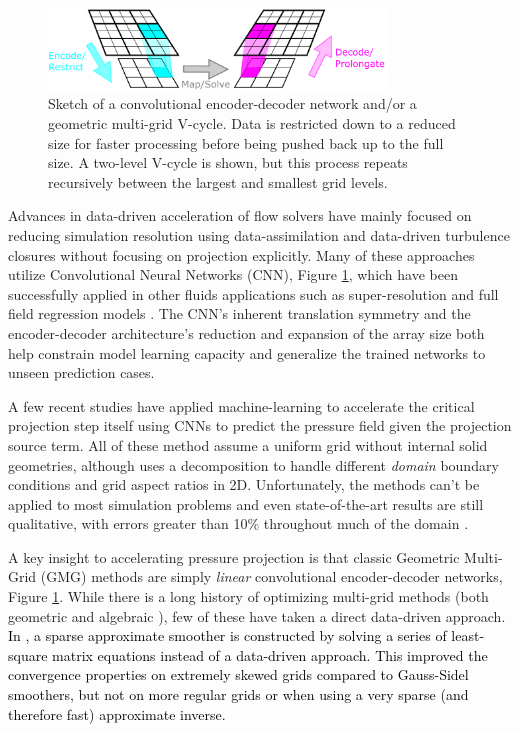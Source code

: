 \documentclass[]{elsarticle}
\begin{document}
\begin{figure}
    \centering
    \includegraphics[width=0.8\textwidth]{figures/drawing}
    \caption{Sketch of a convolutional encoder-decoder network and/or a geometric multi-grid V-cycle. Data is restricted down to a reduced size for faster processing before being pushed back up to the full size. A two-level V-cycle is shown, but this process repeats recursively between the largest and smallest grid levels.}
    \label{fig:multigrid}
\end{figure}

Advances in data-driven acceleration of flow solvers have mainly focused on reducing simulation resolution using data-assimilation and data-driven turbulence closures \cite{asch2016data,BECK2019108910,maulik_san_rasheed_vedula_2019,ling_kurzawski_templeton_2016,font2021deep} without focusing on projection explicitly. Many of these approaches utilize Convolutional Neural Networks (CNN), Figure \ref{fig:multigrid}, which have been successfully applied in other fluids applications such as super-resolution \cite{liu2020deep} and full field regression models \cite{bhatnagar2019prediction}. The CNN's inherent translation symmetry and the encoder-decoder architecture's reduction and expansion of the array size both help constrain model learning capacity and generalize the trained networks to unseen prediction cases. 

A few recent studies have applied machine-learning to accelerate the critical projection step itself \cite{ozbay2021poisson,Xiao2020,ajuria2020} using CNNs to predict the pressure field given the projection source term. All of these method assume a uniform grid without internal solid geometries, although \cite{ozbay2021poisson} uses a decomposition to handle different \textit{domain} boundary conditions and grid aspect ratios in 2D. Unfortunately, the methods can't be applied to most simulation problems and even state-of-the-art results are still qualitative, with errors greater than 10\% throughout much of the domain \cite{ozbay2021poisson}. 

A key insight to accelerating pressure projection is that classic Geometric Multi-Grid (GMG) methods \cite{briggs2000multigrid} are simply \textit{linear} convolutional encoder-decoder networks, Figure \ref{fig:multigrid}. While there is a long history of optimizing multi-grid methods (both geometric \cite{tang2000sparse} and algebraic \cite{brezina2006adaptive}), few of these have taken a direct data-driven approach. \textcolor{black}{In \cite{tang2000sparse}, a sparse approximate smoother is constructed by solving a series of least-square matrix equations instead of a data-driven approach. This improved the convergence properties on extremely skewed grids compared to Gauss-Sidel smoothers, but not on more regular grids or when using a very sparse (and therefore fast) approximate inverse.} 
\end{document}
